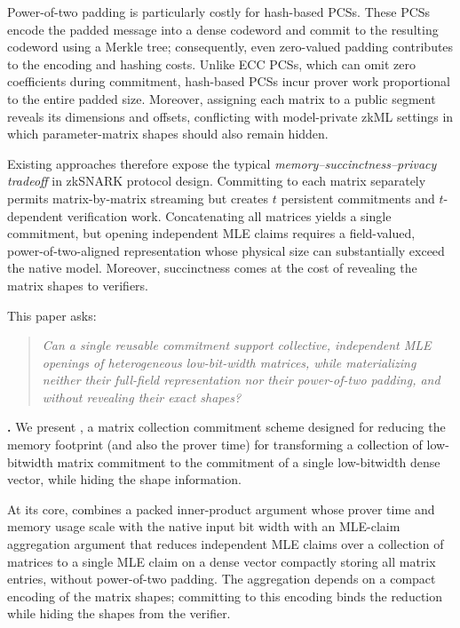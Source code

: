 Power-of-two padding is particularly costly for hash-based PCSs.
These PCSs encode the padded message into a dense codeword and commit to the resulting codeword using a Merkle tree; consequently, even zero-valued padding contributes to the encoding and hashing costs.
Unlike ECC PCSs, which can omit zero coefficients during commitment,
hash-based PCSs incur prover work proportional to the entire padded size.
Moreover, assigning each matrix to a public segment reveals its dimensions and offsets, conflicting with model-private zkML settings in which parameter-matrix shapes should also remain hidden.

Existing approaches therefore expose the typical
\emph{memory--succinctness--privacy tradeoff} in zkSNARK protocol design.
Committing to each matrix separately permits matrix-by-matrix streaming but
creates \(t\) persistent commitments and \(t\)-dependent verification work.
Concatenating all matrices yields a single commitment, but opening independent
MLE claims requires a field-valued, power-of-two-aligned representation whose
physical size can substantially exceed the native model.
Moreover, succinctness comes at the cost of revealing the matrix shapes to verifiers.

This paper asks:
\begin{quote}
\emph{Can a single reusable commitment support collective, independent
MLE openings of heterogeneous low-bit-width matrices, while materializing
neither their full-field representation nor their power-of-two padding, and
without revealing their exact shapes?}
\end{quote}

\mysmallskip
\noindent\textbf{\methodname.}
We present \methodname, a matrix collection commitment scheme designed for reducing the memory footprint (and also the prover time) for transforming a collection of low-bitwidth matrix commitment to the commitment of a single low-bitwidth dense vector,
while hiding the shape information.

At its core, \methodname combines a packed inner-product argument whose prover time and memory usage scale with the native input bit width with an MLE-claim aggregation argument that reduces independent MLE claims over a collection of matrices to a single MLE claim on a dense vector compactly storing all matrix entries, without power-of-two padding.
The aggregation depends on a compact encoding of the matrix shapes; committing to this encoding binds the reduction while hiding the shapes from the verifier.

